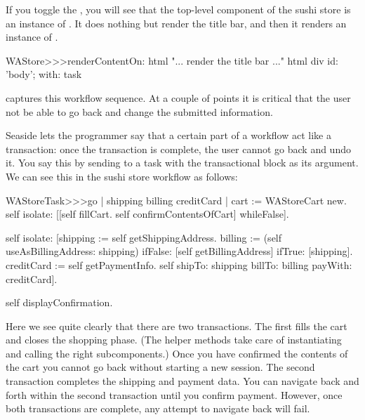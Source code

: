 \documentclass[a4paper,10pt,twoside]{book}
\begin{document}
If you toggle the , you will see that the top-level component of the sushi store is an instance of .
It does nothing but render the title bar, and then it renders an instance of .

\begin{code}{}
WAStore>>>renderContentOn: html
	"... render the title bar ..."
	html div id: 'body'; with: task
\end{code}

 captures this workflow sequence. 
At a couple of points it is critical that the user not be able to go back and change the submitted information.


Seaside lets the programmer say that a certain part of a workflow act like a transaction: once the transaction is complete, the user cannot go back and undo it.
You say this by sending  to a task with the transactional block as its argument.
We can see this in the sushi store workflow as follows:

\begin{code}{}
WAStoreTask>>>go
	| shipping billing creditCard |
	cart := WAStoreCart new.
	self isolate:
		[[self fillCart.
		self confirmContentsOfCart]
			whileFalse].

	self isolate:
		[shipping := self getShippingAddress.
		billing := (self useAsBillingAddress: shipping)
					ifFalse: [self getBillingAddress]
					ifTrue: [shipping].
		creditCard := self getPaymentInfo.
		self shipTo: shipping billTo: billing payWith: creditCard].

	self displayConfirmation.
\end{code}

Here we see quite clearly that there are two transactions.
The first fills the cart and closes the shopping phase.
(The helper methods  \etc take care of instantiating and calling the right subcomponents.)
Once you have confirmed the contents of the cart you cannot go back without starting a new session.
The second transaction completes the shipping and payment data.
You can navigate back and forth within the second transaction until you confirm payment.
However, once both transactions are complete, any attempt to navigate back will fail.
\end{document}
